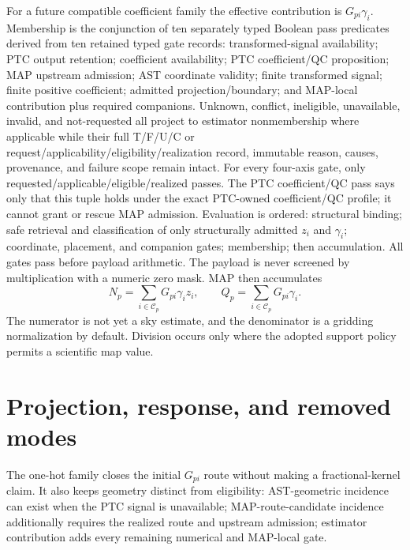 \documentclass[10pt]{article}
\begin{document}
For a future compatible coefficient family the effective contribution is
\(G_{pi}\gamma_i\). Membership is the conjunction of ten separately typed
Boolean pass predicates derived from ten retained typed gate records:
transformed-signal availability; PTC output retention; coefficient
availability; PTC coefficient/QC proposition; MAP upstream admission; AST
coordinate validity; finite transformed signal; finite positive coefficient;
admitted projection/boundary; and MAP-local contribution plus required
companions. Unknown, conflict, ineligible, unavailable, invalid, and
not-requested all project to estimator nonmembership where applicable while
their full T/F/U/C or request/applicability/eligibility/realization record,
immutable reason, causes, provenance, and failure scope remain intact. For
every four-axis gate, only requested/applicable/eligible/realized passes. The
PTC coefficient/QC pass says only that this tuple holds under the exact
PTC-owned coefficient/QC profile; it cannot grant or rescue MAP admission.
Evaluation is ordered: structural binding; safe retrieval and classification
of only structurally admitted \(z_i\) and \(\gamma_i\); coordinate, placement,
and companion gates; membership; then accumulation. All gates pass before
payload arithmetic. The payload is never screened by multiplication with a
numeric zero mask. MAP then accumulates
\begin{equation}
 N_p=\sum_{i\in\mathcal C_p}G_{pi}\gamma_i z_i,\qquad
 Q_p=\sum_{i\in\mathcal C_p}G_{pi}\gamma_i.
\end{equation}
The numerator is not yet a sky estimate, and the denominator is a gridding
normalization by default. Division occurs only where the adopted support
policy permits a scientific map value.

\section{Projection, response, and removed modes}\label{sec:projection}
The one-hot family closes the initial \(G_{pi}\) route without making a
fractional-kernel claim. It also keeps geometry distinct from eligibility:
AST-geometric incidence can exist when the PTC signal is unavailable;
MAP-route-candidate incidence additionally requires the realized route and
upstream admission; estimator contribution adds every remaining numerical and
MAP-local gate.
\end{document}
